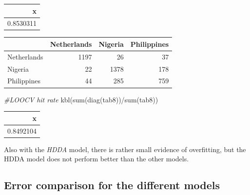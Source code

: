 \documentclass[
  11pt,
]{article}
\newenvironment{Shaded}{\begin{snugshade}}{\end{snugshade}}
\newcommand{\AttributeTok}[1]{\textcolor[rgb]{0.77,0.63,0.00}{#1}}
\newcommand{\CommentTok}[1]{\textcolor[rgb]{0.56,0.35,0.01}{\textit{#1}}}
\newcommand{\ConstantTok}[1]{\textcolor[rgb]{0.00,0.00,0.00}{#1}}
\newcommand{\FunctionTok}[1]{\textcolor[rgb]{0.00,0.00,0.00}{#1}}
\newcommand{\NormalTok}[1]{#1}
\newcommand{\OtherTok}[1]{\textcolor[rgb]{0.56,0.35,0.01}{#1}}
\newcommand{\SpecialCharTok}[1]{\textcolor[rgb]{0.00,0.00,0.00}{#1}}
\newcommand{\StringTok}[1]{\textcolor[rgb]{0.31,0.60,0.02}{#1}}
\begin{document}
\begin{tabular}[t]{r}
\hline
x\\
\hline
0.8530311\\
\hline
\end{tabular}

\begin{Shaded}
\end{Shaded}

\begin{tabular}[t]{l|r|r|r}
\hline
  & Netherlands & Nigeria & Philippines\\
\hline
Netherlands & 1197 & 26 & 37\\
\hline
Nigeria & 22 & 1378 & 178\\
\hline
Philippines & 44 & 285 & 759\\
\hline
\end{tabular}

\begin{Shaded}
\begin{Highlighting}[]
\CommentTok{\#LOOCV hit rate}
\FunctionTok{kbl}\NormalTok{(}\FunctionTok{sum}\NormalTok{(}\FunctionTok{diag}\NormalTok{(tab8))}\SpecialCharTok{/}\FunctionTok{sum}\NormalTok{(tab8))}
\end{Highlighting}
\end{Shaded}

\begin{tabular}[t]{r}
\hline
x\\
\hline
0.8492104\\
\hline
\end{tabular}

Also with the \emph{HDDA} model, there is rather small evidence of overfitting, but the HDDA model does not perform better than the other models.

\hypertarget{error-comparison-for-the-different-models}{%
\subsection{Error comparison for the different models}\label{error-comparison-for-the-different-models}}
\end{document}
